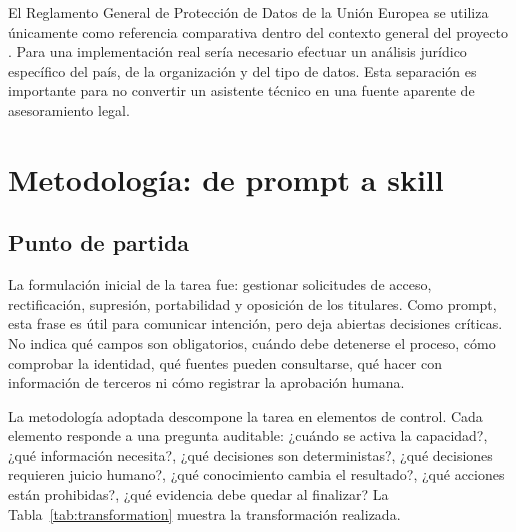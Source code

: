 \documentclass[11pt,a4paper]{article}
\begin{document}
El Reglamento General de Protección de Datos de la Unión Europea se utiliza únicamente como referencia comparativa dentro del contexto general del proyecto \cite{gdpr}. Para una implementación real sería necesario efectuar un análisis jurídico específico del país, de la organización y del tipo de datos. Esta separación es importante para no convertir un asistente técnico en una fuente aparente de asesoramiento legal.

\section{Metodología: de prompt a skill}

\subsection{Punto de partida}

La formulación inicial de la tarea fue: gestionar solicitudes de acceso, rectificación, supresión, portabilidad y oposición de los titulares. Como prompt, esta frase es útil para comunicar intención, pero deja abiertas decisiones críticas. No indica qué campos son obligatorios, cuándo debe detenerse el proceso, cómo comprobar la identidad, qué fuentes pueden consultarse, qué hacer con información de terceros ni cómo registrar la aprobación humana.

La metodología adoptada descompone la tarea en elementos de control. Cada elemento responde a una pregunta auditable: ¿cuándo se activa la capacidad?, ¿qué información necesita?, ¿qué decisiones son deterministas?, ¿qué decisiones requieren juicio humano?, ¿qué conocimiento cambia el resultado?, ¿qué acciones están prohibidas?, ¿qué evidencia debe quedar al finalizar? La Tabla~\ref{tab:transformation} muestra la transformación realizada.
\end{document}
